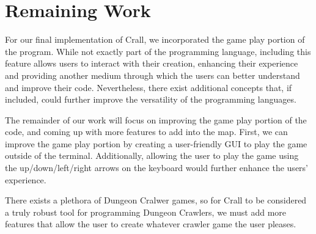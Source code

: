 \documentclass[10pt]{article}
\begin{document}
    \section{Remaining Work}

    For our final implementation of Crall, we incorporated the game play portion of the program. While not exactly part of the programming language, including this feature allows users to interact with their creation, enhancing their experience and providing another medium through which the users can better understand and improve their code. Nevertheless, there exist additional concepts that, if included, could further improve the versatility of the programming languages.
    
    The remainder of our work will focus on improving the game play portion of the code, and coming up with more features to add into the map. First, we can improve the game play portion by creating a user-friendly GUI to play the game outside of the terminal. Additionally, allowing the user to play the game using the up/down/left/right arrows on the keyboard would further enhance the users' experience. 
    
    There exists a plethora of Dungeon Cralwer games, so for Crall to be considered a truly robust tool for programming Dungeon Crawlers, we must add more features that allow the user to create whatever crawler game the user pleases. 
\end{document}
